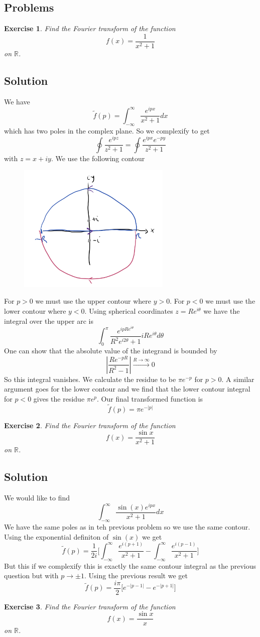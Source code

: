\documentclass[11pt,a4paper]{article}
\newtheorem*{exercise}{Exercise}
\newcommand{\solution}[1]{
	\subsection*{Solution}
	#1
}
\newcommand{\problems}[1]{
	\subsection*{Problems}
	#1
}
\begin{document}
\problems{
\begin{exercise}
	Find the Fourier transform of the function
	\[
	f(x) = \frac{1}{x^2 + 1}
	\]
	on $\mathbb{R}$.
\end{exercise}
\solution{
We have
$$
\tilde{f}(p) = \int_{-\infty}^{\infty} \frac{e^{ipx}}{x^{2}+1}dx
$$
which has two poles in the complex plane. So we complexify to get
$$
\oint \frac{e^{ipz}}{z^{2}+1} = \oint\frac{e^{ipx}e^{-py}}{z^{2}+1}
$$
with $z=x+iy$. We use the following contour
\begin{figure}[H]
	\centering
	\includegraphics[width=0.65\textwidth]{contour2.png} %
\end{figure}
}
For $p>0$ we must use the upper contour where $y>0$. For $p<0$ we must use the lower contour where $y<0$. Using spherical coordinates $z = Re^{i\theta}$ we have the integral over the upper arc is
$$
\int_{0}^{\pi}\frac{e^{ipRe^{i\theta}}}{R^{2}e^{i2\theta}+1}iRe^{i\theta}d\theta
$$
One can show that the absolute value of the integrand is bounded by
$$
|\frac{Re^{-pR}}{R^{2}-1}|\xrightarrow{R\to\infty} 0
$$
So this integral vanishes. We calculate the residue to be $\pi e^{-p}$ for $p>0$. A similar argument goes for the lower contour and we find that the lower contour integral for $p<0$ gives the residue $\pi e^{p}$. Our final transformed function is 
$$
\tilde{f}(p) = \pi e^{-|p|}
$$
\begin{exercise}
	Find the Fourier transform of the function
	\[
	f(x) = \frac{\sin x}{x^2 + 1}
	\]
	on $\mathbb{R}$.
\end{exercise}
\solution{
We would like to find
$$
\int_{-\infty}^{\infty}\frac{\sin(x)e^{ipx}}{x^{2}+1}dx
$$
We have the same poles as in teh previous problem so we use the same contour. Using the exponential definiton of $\sin{(x)}$ we get
$$
\tilde{f}(p)=\frac{1}{2i}\big[\int_{-\infty}^{\infty}\frac{e^{i(p+1)}}{x^{2}+1}-\int_{-\infty}^{\infty}\frac{e^{i(p-1)}}{x^{2}+1}\big]
$$
But this if we complexify this is exactly the same contour integral as the previous question but with $p\to\pm1$. Using the previous result we get
$$
\tilde{f}(p) = \frac{i\pi}{2}\big[e^{-|p-1|}-e^{-|p+1|}\big]
$$
}
\begin{exercise}
	Find the Fourier transform of the function
	\[
	f(x) = \frac{\sin x}{x}
	\]
	on $\mathbb{R}$.
\end{exercise}
}
\end{document}

